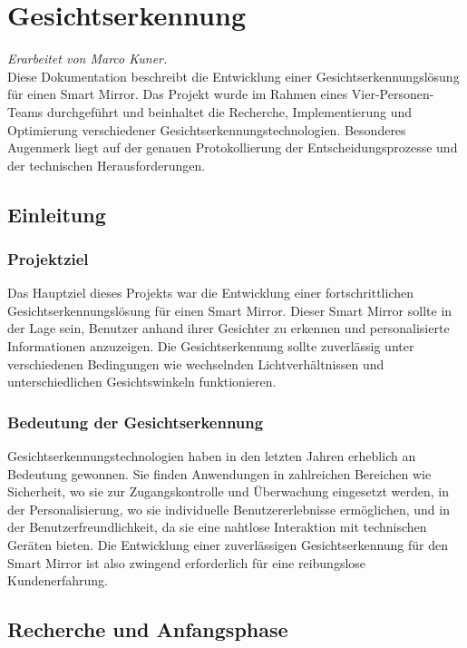 \chapter{Gesichtserkennung}
\textit{Erarbeitet von Marco Kuner.} \\

\noindent
Diese Dokumentation beschreibt die Entwicklung einer Gesichtserkennungslösung für einen Smart Mirror. Das Projekt wurde im Rahmen eines Vier-Personen-Teams durchgeführt und beinhaltet die Recherche, Implementierung und Optimierung verschiedener Gesichtserkennungstechnologien. Besonderes Augenmerk liegt auf der genauen Protokollierung der Entscheidungsprozesse und der technischen Herausforderungen.

\section{Einleitung}

\subsection{Projektziel}
Das Hauptziel dieses Projekts war die Entwicklung einer fortschrittlichen Gesichtserkennungslösung für einen Smart Mirror. Dieser Smart Mirror sollte in der Lage sein, Benutzer anhand ihrer Gesichter zu erkennen und personalisierte Informationen anzuzeigen. Die Gesichtserkennung sollte zuverlässig unter verschiedenen Bedingungen wie wechselnden Lichtverhältnissen und unterschiedlichen Gesichtswinkeln funktionieren.

\subsection{Bedeutung der Gesichtserkennung}
Gesichtserkennungstechnologien haben in den letzten Jahren erheblich an Bedeutung gewonnen. Sie finden Anwendungen in zahlreichen Bereichen wie Sicherheit, wo sie zur Zugangskontrolle und Überwachung eingesetzt werden, in der Personalisierung, wo sie individuelle Benutzererlebnisse ermöglichen, und in der Benutzerfreundlichkeit, da sie eine nahtlose Interaktion mit technischen Geräten bieten. Die Entwicklung einer zuverlässigen Gesichtserkennung für den Smart Mirror ist also zwingend erforderlich für eine reibungslose Kundenerfahrung.



\section{Recherche und Anfangsphase}

